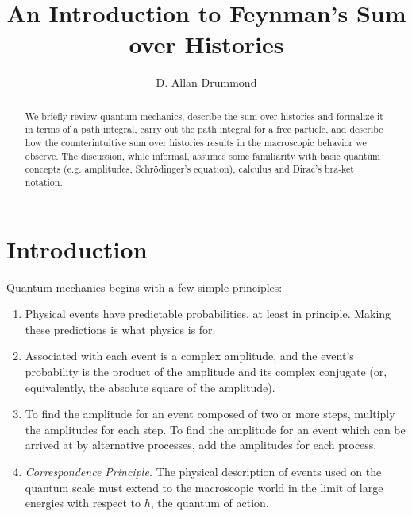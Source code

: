 \documentclass{amsart}
\author[D. A. Drummond]{D. Allan Drummond}
\title[The Sum over Histories]{An Introduction to Feynman's Sum over Histories}
\begin{document}
\begin{abstract}
We briefly review quantum mechanics, describe the sum over histories and formalize it in terms of a path integral, carry out the path integral for a free particle, and describe how the counterintuitive sum over histories results in the macroscopic behavior we observe.  The discussion, while informal, assumes some familiarity with basic quantum concepts (e.g. amplitudes, Schr\"odinger's equation), calculus and Dirac's bra-ket notation.
\end{abstract}

\maketitle

\section{Introduction}

Quantum mechanics begins with a few simple principles:
\begin{enumerate}
\item{Physical events have predictable probabilities, at least in principle.  Making these predictions is what physics is for.}
\item{Associated with each event is a complex amplitude, and the event's probability is the product of the amplitude and its complex conjugate (or, equivalently, the absolute square of the amplitude).}
\item{To find the amplitude for an event composed of two or more steps, multiply the amplitudes for each step.  To find the amplitude for an event which can be arrived at by alternative processes, add the amplitudes for each process.}
\item{\emph{Correspondence Principle.} The physical description of events used on the quantum scale must extend to the macroscopic world in the limit of large energies with respect to $h$, the quantum of action.}
\end{enumerate}
\end{document}
